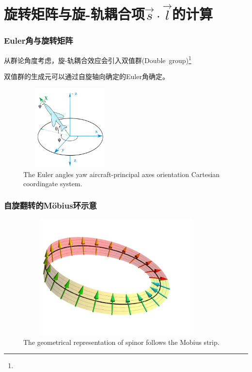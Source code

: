 \section{旋转矩阵与旋-轨耦合项$\vec s\cdot\vec l$的计算}
\frame
{
	\frametitle{\textrm{Euler}角与旋转矩阵}
	从群论角度考虑，旋-轨耦合效应会引入双值群\textrm{(Double~group)}\footnote{\fontsize{5.2pt}{6.2pt}}

	双值群的生成元可以通过自旋轴向确定的\textrm{Euler}角确定。

	{\fontsize{6.5pt}{4.2pt}}
	\begin{figure}[h!]
\centering
\vspace*{-0.21in}
\hspace*{-0.1in}
\includegraphics[height=1.7in,width=2.0in,viewport=2 5 1162 1180,clip]{Figures/euler-angles-yaw-aircraft-principal-axes-orientation-cartesian-coordinate-system.png}
\caption{\tiny \textrm{The Euler angles yaw aircraft-principal axes orientation Cartesian coordingate system.}}%
\label{Fig:Euler}
\end{figure}
}

\frame
{
	\frametitle{自旋翻转的\textrm{M\"obius}环示意}
	\begin{figure}[h!]
\centering
\vspace*{-0.10in}
\includegraphics[height=2.5in,width=4.0in,viewport=0 30 330 250,clip]{Figures/spin_half_mobius.jpg}
\caption{\tiny \textrm{The geometrical representation of spinor follows the Mobius strip.}}%
\label{Fig:Mobius}
\end{figure}
}

